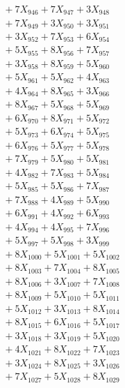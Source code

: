 \documentclass[a4paper,10pt]{article}
\begin{document}
{\begin{align}
&\;  + 7 X_{946} + 7 X_{947} + 3 X_{948} \\[0.3ex]
&\;  + 7 X_{949} + 3 X_{950} + 3 X_{951} \\[0.3ex]
&\;  + 3 X_{952} + 7 X_{953} + 6 X_{954} \\[0.3ex]
&\;  + 5 X_{955} + 8 X_{956} + 7 X_{957} \\[0.3ex]
&\;  + 3 X_{958} + 8 X_{959} + 5 X_{960} \\[0.3ex]
&\;  + 5 X_{961} + 5 X_{962} + 4 X_{963} \\[0.3ex]
&\;  + 4 X_{964} + 8 X_{965} + 3 X_{966} \\[0.3ex]
&\;  + 8 X_{967} + 5 X_{968} + 5 X_{969} \\[0.5ex]\allowbreak
&\;  + 6 X_{970} + 8 X_{971} + 5 X_{972} \\[0.3ex]
&\;  + 5 X_{973} + 6 X_{974} + 5 X_{975} \\[0.3ex]
&\;  + 6 X_{976} + 5 X_{977} + 5 X_{978} \\[0.3ex]
&\;  + 7 X_{979} + 5 X_{980} + 5 X_{981} \\[0.3ex]
&\;  + 4 X_{982} + 7 X_{983} + 5 X_{984} \\[0.3ex]
&\;  + 5 X_{985} + 5 X_{986} + 7 X_{987} \\[0.3ex]
&\;  + 7 X_{988} + 4 X_{989} + 5 X_{990} \\[0.3ex]
&\;  + 6 X_{991} + 4 X_{992} + 6 X_{993} \\[0.3ex]
&\;  + 4 X_{994} + 4 X_{995} + 7 X_{996} \\[0.3ex]
&\;  + 5 X_{997} + 5 X_{998} + 3 X_{999} \\[0.5ex]\allowbreak
&\;  + 8 X_{1000} + 5 X_{1001} + 5 X_{1002} \\[0.3ex]
&\;  + 8 X_{1003} + 7 X_{1004} + 8 X_{1005} \\[0.3ex]
&\;  + 8 X_{1006} + 3 X_{1007} + 7 X_{1008} \\[0.3ex]
&\;  + 8 X_{1009} + 5 X_{1010} + 5 X_{1011} \\[0.3ex]
&\;  + 5 X_{1012} + 3 X_{1013} + 8 X_{1014} \\[0.3ex]
&\;  + 8 X_{1015} + 6 X_{1016} + 5 X_{1017} \\[0.3ex]
&\;  + 3 X_{1018} + 3 X_{1019} + 5 X_{1020} \\[0.3ex]
&\;  + 4 X_{1021} + 8 X_{1022} + 7 X_{1023} \\[0.3ex]
&\;  + 3 X_{1024} + 8 X_{1025} + 3 X_{1026} \\[0.3ex]
&\;  + 7 X_{1027} + 5 X_{1028} + 8 X_{1029} \\[0.5ex]\allowbreak

\end{align}}
\end{document}
